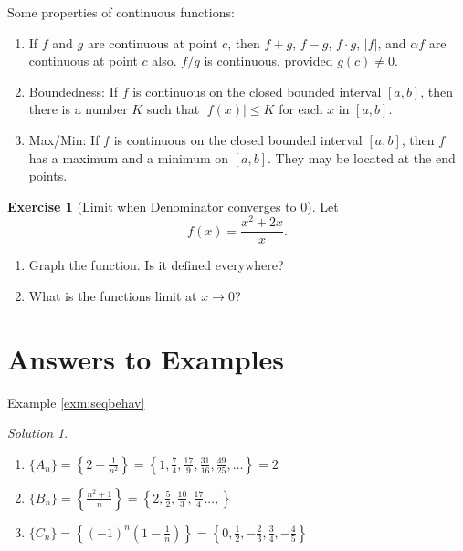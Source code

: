 \documentclass[
]{book}
\providecommand{\tightlist}{%
  \setlength{\itemsep}{0pt}\setlength{\parskip}{0pt}}
\theoremstyle{definition}
\theoremstyle{definition}
\theoremstyle{definition}
\newtheorem{exercise}{Exercise}[chapter]
\theoremstyle{definition}
\theoremstyle{remark}
\newtheorem*{solution}{Solution}
\begin{document}
Some properties of continuous functions:

\begin{enumerate}
\def\labelenumi{\arabic{enumi}.}
\tightlist
\item
  If \(f\) and \(g\) are continuous at point \(c\), then \(f+g\), \(f-g\), \(f \cdot g\), \(|f|\), and \(\alpha f\) are continuous at point \(c\) also. \(f/g\) is continuous, provided \(g(c)\ne 0\).
\item
  Boundedness: If \(f\) is continuous on the closed bounded interval \([a,b]\), then there is a number \(K\) such that \(|f(x)|\le K\) for each \(x\) in \([a,b]\).
\item
  Max/Min: If \(f\) is continuous on the closed bounded interval \([a,b]\), then \(f\) has a maximum and a minimum on \([a,b]\). They may be located at the end points.
\end{enumerate}

\begin{exercise}[Limit when Denominator converges to 0]
\protect\hypertarget{exr:discontdraw}{}{\label{exr:discontdraw} {} }
Let \[f(x) = \frac{x^2 + 2x}{x}.\]

\begin{enumerate}
\def\labelenumi{\arabic{enumi}.}
\tightlist
\item
  Graph the function. Is it defined everywhere?
\item
  What is the functions limit at \(x \rightarrow 0\)?
\end{enumerate}
\end{exercise}

\hypertarget{answers-to-examples}{%
\section*{Answers to Examples}\label{answers-to-examples}}

Example \ref{exm:seqbehav}

\begin{solution}
{}

\begin{enumerate}
\def\labelenumi{\arabic{enumi}.}
\tightlist
\item
  \(\{A_n\}=\left\{ 2-\frac{1}{n^2} \right\} = \left\{1, \frac{7}{4}, \frac{17}{9}, \frac{31}{16}, \frac{49}{25}, \ldots\right\} = 2\)
\item
  \(\{B_n\}=\left\{\frac{n^2+1}{n} \right\} = \left\{2, \frac{5}{2}, \frac{10}{3}, \frac{17}{4}..., \right\}\)
\item
  \(\{C_n\}=\left\{(-1)^n \left(1-\frac{1}{n}\right) \right\} = \left\{0, \frac{1}{2}, -\frac{2}{3}, \frac{3}{4}, -\frac{4}{5}\right\}\)
\end{enumerate}
\end{solution}
\end{document}
